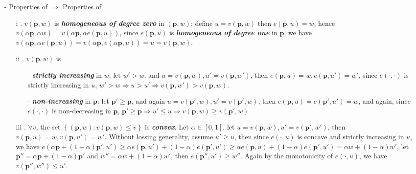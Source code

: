\begin{enumerate}
    \item[-] Properties  of $\Rightarrow$ Properties of  
    \begin{enumerate}
        \item[i] . $v(\mathbf{p},w)$ is \textit{\textbf{homogeneous of degree zero}} in $(\mathbf{p},w)$: define $u=v(\mathbf{p},w)$ then $e(\mathbf{p},u)=w$, hence $v(\alpha\mathbf{p},\alpha w)=v(\alpha\mathbf{p},\alpha e(\mathbf{p},u))$, since $e(\mathbf{p},u)$ is \textit{\textbf{homogeneous of degree one}} in $\mathbf{p}$, we have $v(\alpha \mathbf{p},\alpha e(\mathbf{p},u))=v(\alpha\mathbf{p},e(\alpha \mathbf{p},u))=u=v(\mathbf{p},w)$.
        \item[ii] . $v(\mathbf{p},w)$ is
        \begin{enumerate}
            \item[-] \textit{\textbf{strictly increasing}} in $w$: let $w'>w$, and $u=v(\mathbf{p},w),u'=v(\mathbf{p},w')$, then $e(\mathbf{p},u)=w,e(\mathbf{p},u')=w'$, since $e(\cdot,\cdot)$ is strictly increasing in $u$, $w'>w\Rightarrow u>u'\Rightarrow v(\mathbf{p},w')>v(\mathbf{p},w)$.
            \item[-] \textit{\textbf{non-increasing}} in $\mathbf{p}$: let $\mathbf{p}'\geq \mathbf{p}$, and again $u=v(\mathbf{p}',w),u'=v(\mathbf{p}',w)$, then $e(\mathbf{p},u)=e(\mathbf{p}',u')=w$, and again, since $e(\cdot,\cdot)$ is non-decreasing in $\mathbf{p}$, $\mathbf{p}'\geq \mathbf{p}\Rightarrow u'\leq u\Rightarrow v(\mathbf{p},w)\geq v(\mathbf{p}',w)$
        \end{enumerate}
        \item[iii] . $\forall \bar{v}$, the set $\left\{(\mathbf{p},w):v(\mathbf{p},w)\leq \bar{v}\right\}$ is \textit{\textbf{convex}}. Let $\alpha \in[0,1]$, let $u=v(\mathbf{p},w),u'=v(\mathbf{p}',w')$, then $v(\mathbf{p},u)=w,v(\mathbf{p},u')=w'$. Without lossing generality, assume $u'\geq u$, then since $e(\cdot,u)$ is concave and strictly increasing in $u$, 
        we have $e(\alpha\mathbf{p}+(1-\alpha)\mathbf{p}',u')\geq \alpha e(\mathbf{p},u')+(1-\alpha)e(\mathbf{p}',u')\geq \alpha e(\mathbf{p},u)+(1-\alpha)e(\mathbf{p}',u')=\alpha w+(1-\alpha)w' $, let $\mathbf{p}''=\alpha\mathbf{p}+(1-\alpha)\mathbf{p}'$ and $w''=\alpha w+(1-\alpha)w'$, then $e(\mathbf{p}'',u')\geq w''$. Again by the monotonicity of $e(\cdot,u)$, we have $v(\mathbf{p}'',w'')\leq u'$.

\end{enumerate}
\end{enumerate}
